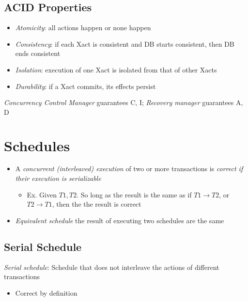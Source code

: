   \subsection{ACID Properties}

    \begin{itemize}
      \item \emph{Atomicity}: all actions happen or none happen
      \item \emph{Consistency}: if each Xact is consistent and DB starts consistent,
      then DB ends consistent
      \item \emph{Isolation}: execution of one Xact is isolated from that of
      other Xacts
      \item \emph{Durability}: if a Xact commits, its effects persist
    \end{itemize}

    \emph{Concurrency Control Manager} guarantees C, I; \emph{Recovery manager}
    guarantees A, D

\section{Schedules}

  \begin{itemize}
    \item A \emph{concurrent (interleaved) execution} of two or more
    transactions is \emph{correct if their execution is serializable}
    \begin{itemize}
      \item Ex. Given $ T1, T2 $. So long as the result is the same as if $ T1 \to T2 $,
      or $ T2 \to T1 $, then the the result is correct
    \end{itemize}
    \item \emph{Equivalent schedule} the result of executing two schedules
    are the same
  \end{itemize}

  \subsection{Serial Schedule}

    \emph{Serial schedule}: Schedule that does not interleave the actions of
    different transactions

    \begin{itemize}
      \item Correct by definition
    \end{itemize}

